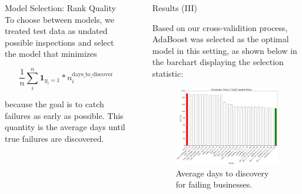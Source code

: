\documentclass[final]{beamer}
\newlength{\sepwid}
\newlength{\onecolwid}
\newlength{\twocolwid}
\begin{document}
\begin{frame}[t]
\begin{columns}[t]
\begin{column}{\twocolwid}
\begin{columns}[t, totalwidth=\twocolwid]
\begin{column}{\onecolwid}
\begin{alertblock}{Model Selection: Rank Quality}
To choose between models, we treated test data
as undated possible inspections and select the model
that minimizes

\begin{equation}
\frac{1}{n} \sum_i^n \mathbf{1}_{y_i = 1} * n_i^{\text{days\_to\_discover}}
\end{equation}

because the goal is to catch failures as early as 
possible. This quantity is the average days until true failures are discovered.

\end{alertblock}
\end{column}
\end{columns}



\end{column} %

\begin{column}{\sepwid}\end{column} %

\begin{column}{\onecolwid} %


\begin{block}{Results (III)}

Based on our cross-validition process, 
AdaBoost was selected as the optimal
model in this setting, as shown
below in the barchart displaying
the selection statistic:  

\begin{figure}
\includegraphics[width=\linewidth]{figures/exploration/bar_result.png}
\caption{Average days to discovery for failing businesses.}
\end{figure}


\end{block}
\end{column}
\end{columns}
\end{frame}
\end{document}
